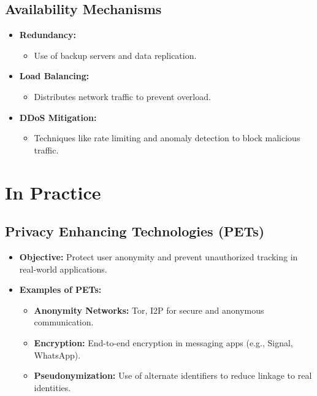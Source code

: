 \documentclass{article}
\begin{document}
\subsection{Availability Mechanisms}
\begin{itemize}
    \item \textbf{Redundancy:}
    \begin{itemize}
        \item Use of backup servers and data replication.
    \end{itemize}
    \item \textbf{Load Balancing:}
    \begin{itemize}
        \item Distributes network traffic to prevent overload.
    \end{itemize}
    \item \textbf{DDoS Mitigation:}
    \begin{itemize}
        \item Techniques like rate limiting and anomaly detection to block malicious traffic.
    \end{itemize}
\end{itemize}




\section{In Practice}

\subsection{Privacy Enhancing Technologies (PETs)}
\begin{itemize}
    \item \textbf{Objective:} Protect user anonymity and prevent unauthorized tracking in real-world applications.
    \item \textbf{Examples of PETs:}
    \begin{itemize}
        \item \textbf{Anonymity Networks:} Tor, I2P for secure and anonymous communication.
        \item \textbf{Encryption:} End-to-end encryption in messaging apps (e.g., Signal, WhatsApp).
        \item \textbf{Pseudonymization:} Use of alternate identifiers to reduce linkage to real identities.
    \end{itemize}
\end{itemize}
\end{document}
